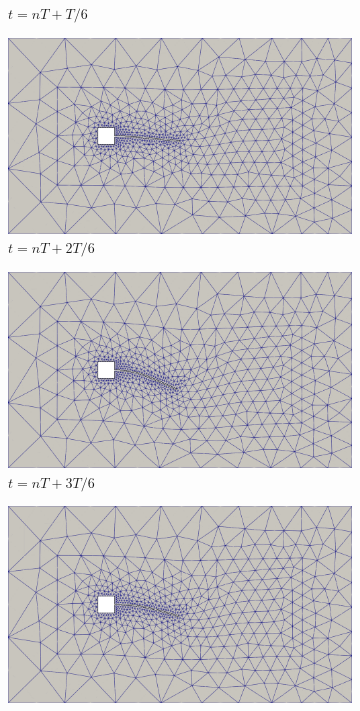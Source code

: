 \begin{figure}[h!]
\begin{subfigure}[b]{0.49\textwidth}
        \caption{$t=nT+T/6$}
    \end{subfigure}
    \begin{subfigure}[b]{0.49\textwidth}
        \includegraphics[width=\linewidth]{Figuras/FSI-prism2/mT3.png}
        \caption{$t=nT+2T/6$}
    \end{subfigure}
    \begin{subfigure}[b]{0.49\textwidth}
        \includegraphics[width=\linewidth]{Figuras/FSI-prism2/mT4.png}
        \caption{$t=nT+3T/6$}
    \end{subfigure}
    \begin{subfigure}[b]{0.49\textwidth}
        \includegraphics[width=\linewidth]{Figuras/FSI-prism2/mT5.png}

\end{subfigure}
\end{figure}
